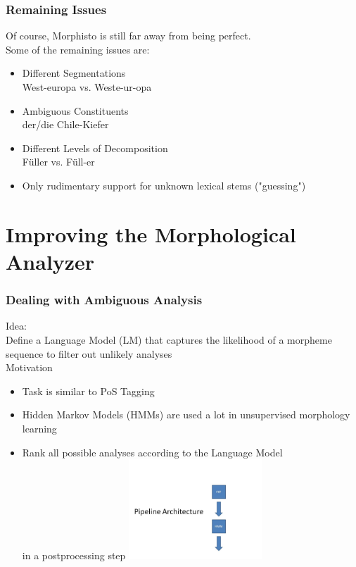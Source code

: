 \documentclass {beamer}
\begin{document}
\frame
{  
\frametitle{Remaining Issues}
Of course, Morphisto is still far away from being perfect. \\
Some of the remaining issues are:  
\begin{itemize}
  \item<1-> Different Segmentations \\
   West-europa vs. Weste-ur-opa 
  \item<2-> Ambiguous Constituents \\
   der/die Chile-Kiefer 
  \item<3-> Different Levels of Decomposition \\
     F\"uller vs. F\"ull-er \\
  \item<4-> Only rudimentary support for unknown lexical stems ("guessing")
\end{itemize}
}


\section{Improving the Morphological Analyzer}

\frame
{  \frametitle{Dealing with Ambiguous Analysis}
Idea:\\
Define a Language Model (LM) that captures the likelihood of a morpheme sequence to filter out unlikely analyses \\
Motivation
 \begin{itemize}
\item Task is similar to PoS Tagging 
\item Hidden Markov Models (HMMs) are used a lot in unsupervised morphology learning
\item Rank all possible analyses according to the Language Model \\
in a postprocessing step
\includegraphics[width=5cm] {Pipeline2.jpg}
\end{itemize}
}
 
\end{document}
